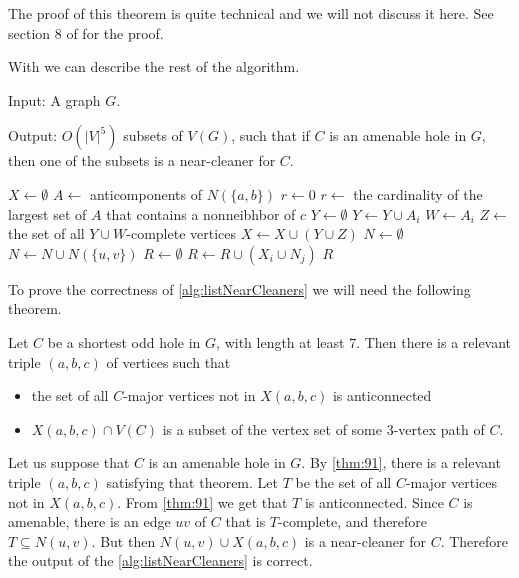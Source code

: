 The proof of this theorem is quite technical and we will not discuss it here. See section 8 of \cite{MC05} for the proof.

With  we can describe the rest of the algorithm.

\begin{alg}
	\label{alg:listNearCleaners}
	Input: A graph $G$.

	\noindent Output: $O(|V|^5)$ subsets of $V(G)$, such that if $C$ is an amenable hole in $G$, then one of the subsets is a near-cleaner for $C$.
\end{alg}

\begin{algorithmic}[1]
	\ls $X \gets \emptyset$
		\ls $A \gets$ anticomponents of $N(\{a, b\})$
			\ls $r \gets 0$
		\mElse
			\ls $r \gets$ the cardinality of the largest set of $A$ that contains 
			\lsx a nonneibhbor of $c$ 
		\mEndIf
		\ls $Y \gets \emptyset$ 
				\ls $Y \gets Y \cup A_i$
			\mEndIf
				\ls $W \gets A_i$
			\mEndIf
		\mEndFor
		\ls $Z \gets$ the set of all $Y \cup W$-complete vertices
		\ls $X \gets X \cup (Y \cup Z)$ 
	\mEndFor
	\ls $N \gets \emptyset$
		\ls $N \gets N \cup N(\{u, v\})$
	\mEndFor
	\ls $R \gets \emptyset$
			\ls $R \gets R \cup (X_i \cup N_j)$
		\mEndFor
	\mEndFor
	\ls \RETURN $R$
	\mEndProcedure
\end{algorithmic}

To prove the correctness of \cref{alg:listNearCleaners} we will need the following theorem.

\begin{theorem}[9.1 of \cite{MC05}]
	\label{thm:91}
	Let $C$ be a shortest odd hole in $G$, with length at least 7. Then there is a relevant triple $(a, b, c)$ of vertices such that
	\begin{itemize}
		\item the set of all $C$-major vertices not in $X(a, b, c)$ is anticonnected
		\item $X(a, b, c) \cap V(C)$ is a subset of the vertex set of some 3-vertex path of $C$.
	\end{itemize}
\end{theorem}

Let us suppose that $C$ is an amenable hole in $G$. By \cref{thm:91}, there is a relevant triple $(a, b, c)$ satisfying that theorem. Let $T$ be the set of all $C$-major vertices not in $X(a,b,c)$. From \cref{thm:91} we get that $T$ is anticonnected. Since $C$ is amenable, there is an edge $uv$ of $C$ that is $T$-complete, and therefore $T \subseteq N(u, v)$. But then $N(u, v) \cup X(a, b, c)$ is a near-cleaner for $C$. Therefore the output of the \cref{alg:listNearCleaners} is correct.

